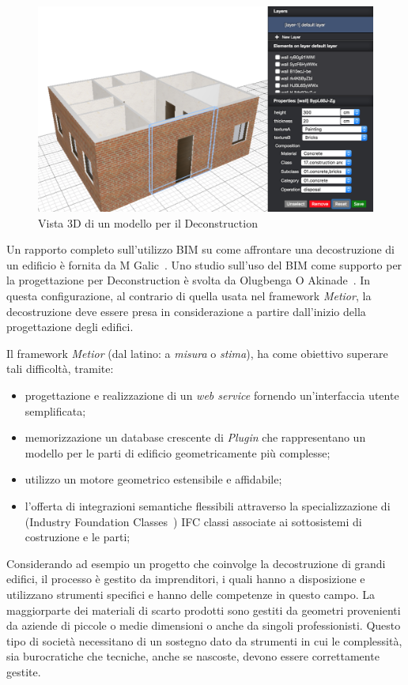 \begin{figure}[htbp] %
   \centering
   \includegraphics[width=1\linewidth]{images/3d-sel}
   \caption{Vista 3D di un modello per il Deconstruction}
   \label{fig:augmented}
\end{figure}

Un rapporto completo sull'utilizzo BIM su come affrontare una decostruzione di un edificio è fornita da M Galic~\cite{galic2014bim}.
Uno studio sull'uso del BIM come supporto per la progettazione per Deconstruction è svolta da Olugbenga O Akinade~\cite{akinade2015waste}.
In questa configurazione, al contrario di quella usata nel framework \emph{Metior}, la decostruzione deve essere
presa in considerazione a partire dall'inizio della progettazione degli edifici.
\newpage


Il framework \emph{Metior} (dal latino: a \emph{misura} o \emph{stima}),
ha come obiettivo superare tali difficoltà, tramite:
\begin{itemize}
  \item progettazione e realizzazione di un \emph{web service} fornendo un'interfaccia utente semplificata;
  \item memorizzazione un database crescente di \emph{Plugin} che rappresentano un modello per le parti di edificio geometricamente più complesse;
  \item utilizzo un motore geometrico estensibile e affidabile;
  \item l'offerta di integrazioni semantiche flessibili attraverso la specializzazione di (Industry Foundation Classes~\cite{ifc})
        IFC classi associate ai sottosistemi di costruzione e le parti;
\end{itemize}

Considerando ad esempio un progetto che coinvolge la decostruzione di grandi edifici, il processo è
gestito da imprenditori, i quali hanno a disposizione e utilizzano strumenti specifici e hanno delle competenze in questo campo.
La maggiorparte dei materiali di scarto prodotti sono gestiti da geometri provenienti da aziende di piccole o medie dimensioni
o anche da singoli professionisti.
Questo tipo di società necessitano di un sostegno dato da strumenti in cui le complessità,
sia burocratiche che tecniche, anche se nascoste, devono essere correttamente gestite.
\newpage
